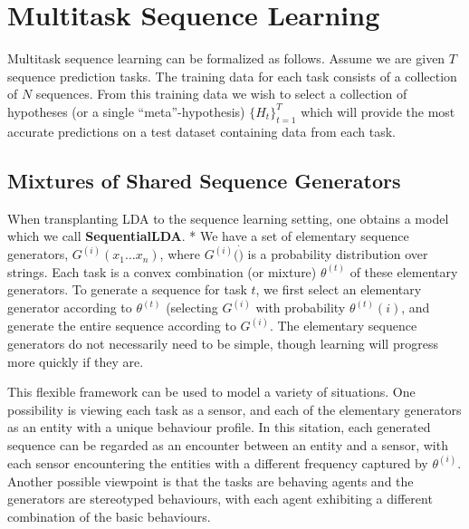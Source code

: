 \documentclass[letterpaper]{article}
\begin{document}
% 
% 
% 

\section{Multitask Sequence Learning}
Multitask sequence learning can be formalized as follows. Assume we are given $T$ sequence prediction tasks. The training data for each task consists of a collection of $N$ sequences. From this training data we wish to select a collection of hypotheses (or a single ``meta''-hypothesis) $\{H_t\}_{t=1}^T$ which will provide the most accurate predictions on a test dataset containing data from each task.

\subsection{Mixtures of Shared Sequence Generators}
When transplanting LDA to the sequence learning setting, one obtains a model which we call \textbf{SequentialLDA}.
* We have a set of elementary sequence generators, $G^{(i)}(x_1\dots x_n)$, where $G^{(i)}(\dot)$ is a probability distribution over strings. Each task is a convex combination (or mixture) $\theta^{(t)}$ of these elementary generators. To generate a sequence for task $t$, we first select an elementary generator according to $\theta^{(t)}$ (selecting $G^{(i)}$ with probability $\theta^{(t)}(i)$, and generate the entire sequence according to $G^{(i)}$. The elementary sequence generators do not necessarily need to be simple, though learning will progress more quickly if they are.

This flexible framework can be used to model a variety of situations. One possibility is viewing each task as a sensor, and each of the elementary generators as an entity with a unique behaviour profile. In this sitation, each generated sequence can be regarded as an encounter between an entity and a sensor, with each sensor encountering the entities with a different frequency captured by $\theta^{(i)}$. Another possible viewpoint is that the tasks are behaving agents and the generators are stereotyped behaviours, with each agent exhibiting a different combination of the basic behaviours.
\end{document}
